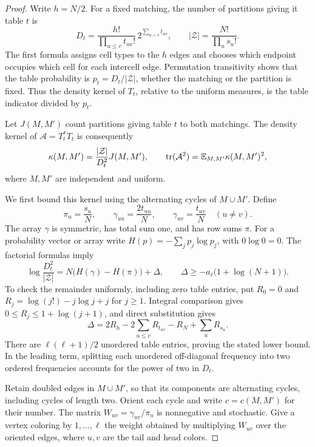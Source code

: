 \begin{proof}
Write \(h=N/2\).  For a fixed matching, the number of partitions
giving it table \(t\) is
\[
 D_t=\frac{h!}{\prod_{u\le v}t_{uv}!}\,
                  2^{\sum_{u<v}t_{uv}},
 \qquad
 |\mathcal Z|=\frac{N!}{\prod_us_u!}.
\]
The first formula assigns cell types to the \(h\) edges and chooses
which endpoint occupies which cell for each intercell edge.
Permutation transitivity shows that the table probability is
\(p_t=D_t/|\mathcal Z|\), whether the matching or the partition is
fixed.  Thus the density kernel of \(T_t\), relative to the uniform
measures, is the table indicator divided by \(p_t\).

Let \(J(M,M')\) count partitions giving table \(t\) to both matchings.
The density kernel of \(\mathcal A=T_t^*T_t\) is consequently
\begin{equation}\label{smooth:eq-matching-kernel}
 \kappa(M,M')=\frac{|\mathcal Z|}{D_t^2}J(M,M'),
 \qquad
 \operatorname{tr}(\mathcal A^2)=\mathbb E_{M,M'}\kappa(M,M')^2,
\end{equation}
where \(M,M'\) are independent and uniform.

We first bound this kernel using the alternating cycles of
\(M\cup M'\).  Define
\[
 \pi_u=\frac{s_u}{N},\qquad
 \gamma_{uu}=\frac{2t_{uu}}N,\qquad
 \gamma_{uv}=\frac{t_{uv}}N\quad(u\ne v).
\]
The array \(\gamma\) is symmetric, has total sum one, and has row sums
\(\pi\).  For a probability vector or array write
\(H(p)=-\sum_jp_j\log p_j\), with \(0\log0=0\).  The factorial
formulas imply
\begin{equation}\label{smooth:eq-table-entropy}
 \log\frac{D_t^2}{|\mathcal Z|}
 =N\bigl(H(\gamma)-H(\pi)\bigr)+\Delta,
 \qquad
 \Delta\ge-a_\ell\bigl(1+\log(N+1)\bigr).
\end{equation}
To check the remainder uniformly, including zero table entries, put
\(R_0=0\) and
\(R_j=\log(j!)-j\log j+j\) for \(j\ge1\).
Integral comparison gives \(0\le R_j\le1+\log(j+1)\), and direct
substitution gives
\[
 \Delta=2R_h-2\sum_{u\le v}R_{t_{uv}}-R_N+\sum_uR_{s_u}.
\]
There are \(\ell(\ell+1)/2\) unordered table entries, proving the
stated lower bound.  In the leading term, splitting each unordered
off-diagonal frequency into two ordered frequencies accounts for
the power of two in \(D_t\).

Retain doubled edges in \(M\cup M'\), so that its components are
alternating cycles, including cycles of length two.  Orient each
cycle and write \(c=c(M,M')\) for their number.  The matrix
\(W_{uv}=\gamma_{uv}/\pi_u\) is nonnegative and stochastic.  Give a
vertex coloring by \(1,\ldots,\ell\) the weight obtained by
multiplying \(W_{uv}\) over the oriented edges, where \(u,v\) are
the tail and head colors.


\end{proof}
